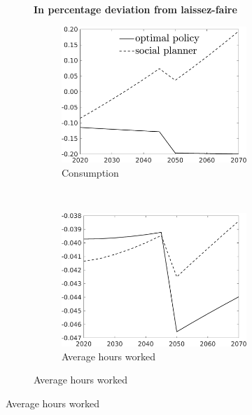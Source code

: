 \begin{figure}[h!!!]
	\centering 	\caption{Efficient and optimal allocation without knowledge spillovers}\label{fig:optAll_percLf_dyn_noKN}
		\begin{subfigure}[]{1\textwidth}	
		\centering\footnotesize{\textbf{In percentage deviation from laissez-faire}}\\ \vspace{2mm}
		\begin{subfigure}[]{0.4\textwidth}
			\caption{Consumption}
			\includegraphics[width=1\textwidth]{../../codding_model/own_basedOnFried/optimalPol_010922_revision/figures/all_13Sept22_Tplus30/C_PercentageLFDyn_Target_regime4_knspil1_spillover0_noskill0_sep0_xgrowth0_PV1_etaa0.79_lgd1.png}
		\end{subfigure}
		\begin{minipage}[]{0.1\textwidth}
			\ 
		\end{minipage}
		\begin{subfigure}[]{0.4\textwidth}
			\caption{Average hours worked }
			\includegraphics[width=1\textwidth]{../../codding_model/own_basedOnFried/optimalPol_010922_revision/figures/all_13Sept22_Tplus30/Hagg_PercentageLFDyn_Target_regime4_knspil1_spillover0_noskill0_sep0_xgrowth0_PV1_etaa0.79_lgd0.png}
		\end{subfigure}
	\end{subfigure}
	

\end{figure}

